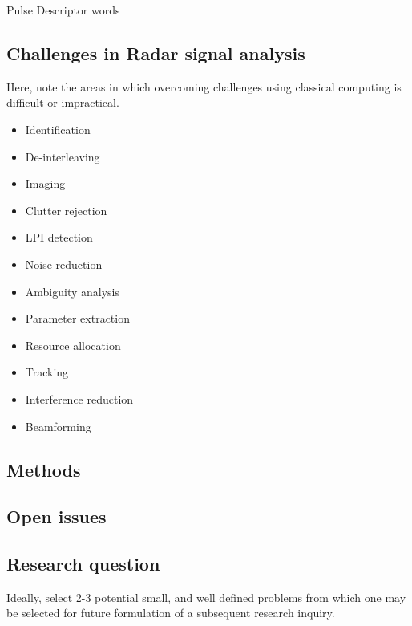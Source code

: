 Pulse Descriptor words


\subsection{Challenges in Radar signal analysis}

Here, note the areas in which overcoming challenges using classical computing is difficult or impractical.

\begin{itemize}
    \item Identification
    \item De-interleaving
    \item Imaging
    \item Clutter rejection
    \item LPI detection
    \item Noise reduction	
    \item Ambiguity analysis
    \item Parameter extraction
    \item Resource allocation
    \item Tracking
    \item Interference reduction
    \item Beamforming
\end{itemize}

\subsection{Methods}

\subsection{Open issues}

\subsection{Research question}

Ideally, select 2-3 potential small, and well defined problems from which one may be selected for future formulation of a subsequent research inquiry.

